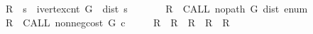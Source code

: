 \begin{isabellebody}
\ \ \ \ {\isasymacute}R{}\ {\isacharcolon}{\isacharequal}{\isacharequal}\ {\isasymacute}s\ {\isacharless}\ ivertex{\isacharunderscore}cnt\ {\isasymacute}G\ {\isasymand}\ {\isasymacute}dist\ {\isasymacute}s\ {\isacharequal}\ {}\ {\isacharsemicolon}{\isacharsemicolon}\isanewline
\ \ \ \ {\isasymacute}R{}\ {\isacharcolon}{\isacharequal}{\isacharequal}\ CALL\ no{\isacharunderscore}path\ {\isacharparenleft}{\isasymacute}G{\isacharcomma}\ {\isasymacute}dist{\isacharcomma}\ {\isasymacute}enum{\isacharparenright}\ {\isacharsemicolon}{\isacharsemicolon}\isanewline
\ \ \ \ {\isasymacute}R{}\ {\isacharcolon}{\isacharequal}{\isacharequal}\ CALL\ non{\isacharunderscore}neg{\isacharunderscore}cost\ {\isacharparenleft}{\isasymacute}G{\isacharcomma}\ {\isasymacute}c{\isacharparenright}\ {\isacharsemicolon}{\isacharsemicolon}\isanewline
\ \ \ \ {\isasymacute}R\ {\isacharcolon}{\isacharequal}{\isacharequal}\ {\isasymacute}R{}\ {\isasymand}\ {\isasymacute}R{}\ {\isasymand}\ {\isasymacute}R{}\ {\isasymand}\ {\isasymacute}R{}\isanewline
\ \ {\isachardoublequoteclose}\isanewline
%
\isadelimtheory
\isanewline
%
\endisadelimtheory
%
\isatagtheory
{}\isamarkupfalse%
%
\endisatagtheory
{\isafoldtheory}%
%
\isadelimtheory
%
\endisadelimtheory
\end{isabellebody}%

